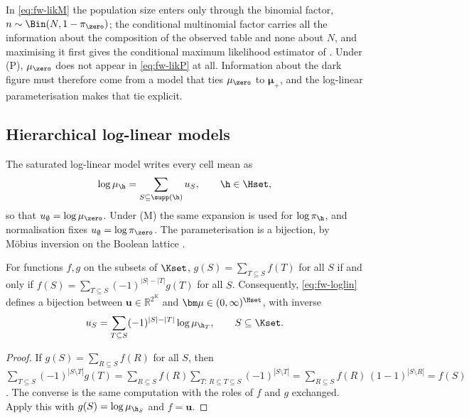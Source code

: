In \eqref{eq:fw-likM} the population size enters only through the binomial factor, $n\sim\Bin(N,1-\pi_{\zero})$; the conditional multinomial factor carries all the information about the composition of the observed table and none about $N$, and maximising it first gives the conditional maximum likelihood estimator of \citet{sanathanan1972}. Under (P), $\mu_{\zero}$ does not appear in \eqref{eq:fw-likP} at all. Information about the dark figure must therefore come from a model that ties $\mu_{\zero}$ to $\bm\mu_+$, and the log-linear parameterisation makes that tie explicit.

\subsection{Hierarchical log-linear models}\label{sec:fw-loglinear}

The saturated log-linear model writes every cell mean as
\begin{equation}\label{eq:fw-loglin}
  \log\mu_{\h}=\sum_{S\subseteq\supp(\h)}u_S,\qquad \h\in\Hset,
\end{equation}
so that $u_\emptyset=\log\mu_{\zero}$. Under (M) the same expansion is used for $\log\pi_{\h}$, and normalisation fixes $u_\emptyset=\log\pi_{\zero}$. The parameterisation is a bijection, by Möbius inversion on the Boolean lattice \citep{rota1964}.

\begin{lemma}\label{lem:fw-mobius}
For functions $f,g$ on the subsets of $\Kset$, $g(S)=\sum_{T\subseteq S}f(T)$ for all $S$ if and only if $f(S)=\sum_{T\subseteq S}(-1)^{|S|-|T|}g(T)$ for all $S$. Consequently, \eqref{eq:fw-loglin} defines a bijection between $\bm u\in\mathbb R^{2^K}$ and $\bm\mu\in(0,\infty)^{\Hset}$, with inverse
\begin{equation}\label{eq:fw-mobius}
  u_S=\sum_{T\subseteq S}(-1)^{|S|-|T|}\log\mu_{\h_T},\qquad S\subseteq\Kset .
\end{equation}
\end{lemma}

\begin{proof}
If $g(S)=\sum_{R\subseteq S}f(R)$ for all $S$, then
$\sum_{T\subseteq S}(-1)^{|S\setminus T|}g(T)=\sum_{R\subseteq S}f(R)\sum_{T:\,R\subseteq T\subseteq S}(-1)^{|S\setminus T|}=\sum_{R\subseteq S}f(R)\,(1-1)^{|S\setminus R|}=f(S)$.
The converse is the same computation with the roles of $f$ and $g$ exchanged. Apply this with $g(S)=\log\mu_{\h_S}$ and $f=\bm u$.
\end{proof}


